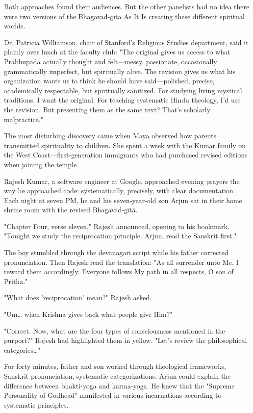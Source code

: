 \documentclass[12pt,twoside]{book}
\begin{document}
Both approaches found their audiences. But the other panelists had no idea there were two versions of the Bhagavad-gītā As It Is creating these different spiritual worlds.

Dr. Patricia Williamson, chair of Stanford's Religious Studies department, said it plainly over lunch at the faculty club: "The original gives us access to what Prabhupāda actually thought and felt—messy, passionate, occasionally grammatically imperfect, but spiritually alive. The revision gives us what his organization wants us to think he should have said—polished, precise, academically respectable, but spiritually sanitized. For studying living mystical traditions, I want the original. For teaching systematic Hindu theology, I'd use the revision. But presenting them as the same text? That's scholarly malpractice."

The most disturbing discovery came when Maya observed how parents transmitted spirituality to children. She spent a week with the Kumar family on the West Coast—first-generation immigrants who had purchased revised editions when joining the temple.

Rajesh Kumar, a software engineer at Google, approached evening prayers the way he approached code: systematically, precisely, with clear documentation. Each night at seven PM, he and his seven-year-old son Arjun sat in their home shrine room with the revised Bhagavad-gītā.

"Chapter Four, verse eleven," Rajesh announced, opening to his bookmark. "Tonight we study the reciprocation principle. Arjun, read the Sanskrit first."

The boy stumbled through the devanagari script while his father corrected pronunciation. Then Rajesh read the translation: "As all surrender unto Me, I reward them accordingly. Everyone follows My path in all respects, O son of Pritha."

"What does 'reciprocation' mean?" Rajesh asked.

"Um\ldots{} when Krishna gives back what people give Him?"

"Correct. Now, what are the four types of consciousness mentioned in the purport?" Rajesh had highlighted them in yellow. "Let's review the philosophical categories\ldots{}"

For forty minutes, father and son worked through theological frameworks, Sanskrit pronunciation, systematic categorizations. Arjun could explain the difference between bhakti-yoga and karma-yoga. He knew that the "Supreme Personality of Godhead" manifested in various incarnations according to systematic principles.
\end{document}
